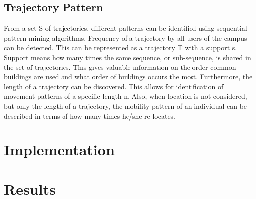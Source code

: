 \subsection{Trajectory Pattern}
From a set S of trajectories, different patterns can be identified using sequential pattern mining algorithms. Frequency of a trajectory by all users of the campus can be detected. This can be represented as a trajectory T with a support s. Support means how many times the same sequence, or sub-sequence, is shared in the set of trajectories. This gives valuable information on the order common buildings are used and what order of buildings occurs the most. Furthermore, the length of a trajectory can be discovered. This allows for identification of movement patterns of a specific length n. Also, when location is not considered, but only the length of a trajectory, the mobility pattern of an individual can be described in terms of how many times he/she re-locates. 
\section{Implementation}
\section{Results}





